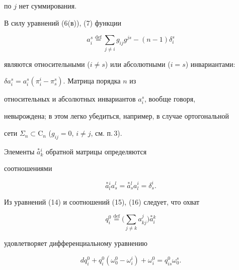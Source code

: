 по $j$ нет суммирования. 


 


В силу уравнений (6(в)), (7) функции 


\begin{equation} 


a^s_i\overset{\mathrm {def}}{=}{}\sum_{j\ne i} 


g_{ij}g^{js}-(n-1)\delta^s_i 


\end{equation} 


являются относительными ($i\ne s$) или абсолютными ($i=s$) инвариантами: 


$\delta a^s_i=a^s_i(\pi^i_i-\pi^s_s)$. Матрица порядка $n$ из 


относительных и абсолютных инвариантов $a^s_i$, вообще говоря, 


невырождена; в этом легко убедиться, например, в случае ортогональной 


сети $\Sigma_n\subset\mathrm C_n$ ($g_{ij}=0$, $i\ne j$, см. п.\,3). 


Элементы $\overset{*}{a}{}^i_k$ обратной матрицы определяются 


соотношениями 


\begin{equation} 


\overset{*}{a}{}^i_l a^l_s=\overset{*}{a}{}^l_s 


a^i_l=\delta^i_s. 


\end{equation} 


 


Из уравнений (14) и соотношений (15), (16) следует, что охват 


\begin{equation} 


q^0_i\overset{\mathrm {def}}{=}{}\Big(\sum_{j\ne k} 


a^j_{kj}\Big)\overset{*}{a}{}^k_i 


\end{equation} 


удовлетворяет дифференциальному уравнению 


\begin{equation} 


dq^0_i+q^0_i(\omega^0_0-\omega^i_i)+\omega^0_i= 


q^0_{is}\omega^s_0. 


\end{equation} 


